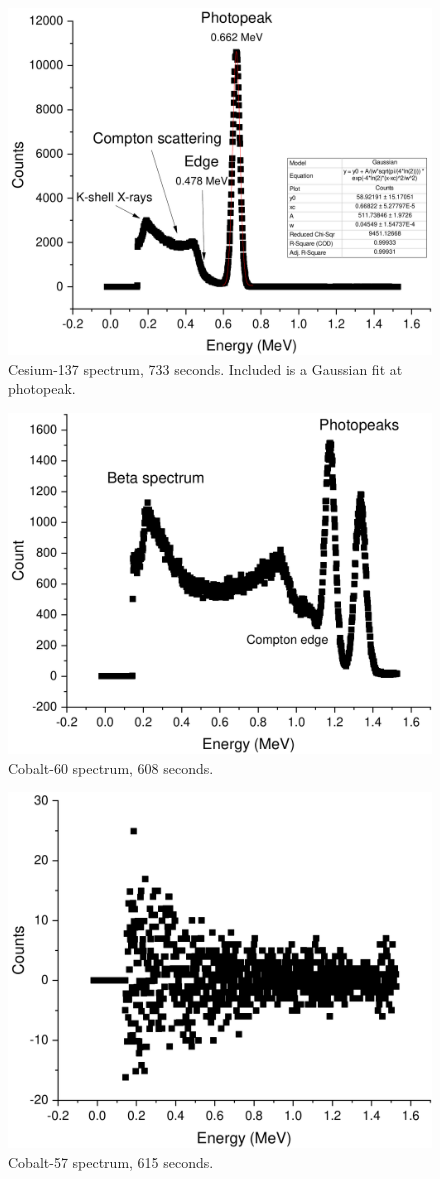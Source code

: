 \documentclass[notitlepage]{report}
\begin{document}
\begin{figure}[p]
	\centering
	\includegraphics[width=0.7\linewidth]{cs137}
	\caption{Cesium-137 spectrum, 733 seconds. Included is a Gaussian fit at photopeak.}
	\label{fig:cs137}
\end{figure}
\begin{figure}[p]
	\centering
	\includegraphics[width=0.7\linewidth]{co60}
	\caption{Cobalt-60 spectrum, 608 seconds.}
	\label{fig:co60}
\end{figure}
\begin{figure}[p]
	\centering
	\includegraphics[width=0.7\linewidth]{co57}
	\caption{Cobalt-57 spectrum, 615 seconds.}
	\label{fig:co57}
\end{figure}
\end{document}
